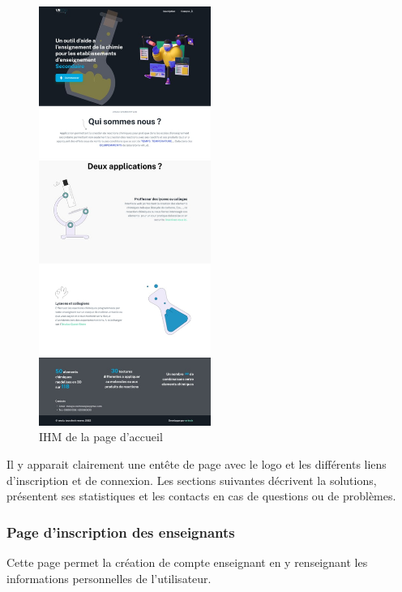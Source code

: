 \begin{figure}[H]
	\centering
	\includegraphics[width=0.5\textwidth]{img/home}
	\caption{IHM de la page d'accueil}
	\label{fig:mesh1}
\end{figure}

Il y apparait clairement une entête de page avec le logo et les différents liens d'inscription et de connexion.
Les sections suivantes décrivent la solutions, présentent ses statistiques et les contacts en cas de questions ou de problèmes.

\subsubsection{Page d'inscription des enseignants}

Cette page permet la création de compte enseignant en y renseignant les informations personnelles de l'utilisateur.

